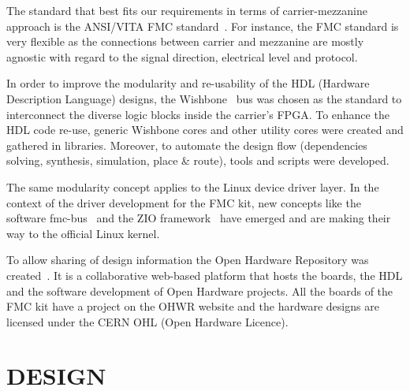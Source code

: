 \documentclass{JAC2003}
\begin{document}

The standard that best fits our requirements in terms of carrier-mezzanine approach is the ANSI/VITA FMC standard~\cite{fmc}.
For instance, the FMC standard is very flexible as the connections between carrier and mezzanine are mostly agnostic with regard to the signal direction, electrical level and protocol.

In order to improve the modularity and re-usability of the HDL (Hardware Description Language) designs, the Wishbone~\cite{wishbone} bus was chosen as the standard to interconnect the diverse logic blocks inside the carrier's FPGA.
To enhance the HDL code re-use, generic Wishbone cores and other utility cores were created and gathered in libraries.
Moreover, to automate the design flow (dependencies solving, synthesis, simulation, place \& route), tools and scripts were developed.

The same modularity concept applies to the Linux device driver layer.
In the context of the driver development for the FMC kit, new concepts like the software fmc-bus~\cite{fmc-bus} and the ZIO framework~\cite{zio} have emerged and are making their way to the official Linux kernel.

To allow sharing of design information the Open Hardware Repository was created~\cite{icalepcs}.
It is a collaborative web-based platform that hosts the boards, the HDL and the software development of Open Hardware projects.
All the boards of the FMC kit have a project on the OHWR website and the hardware designs are licensed under the CERN OHL (Open Hardware Licence).

\section{DESIGN}
\end{document}
